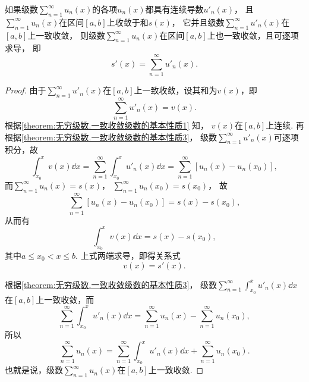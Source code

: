 \begin{property}\label{theorem:无穷级数.一致收敛级数的基本性质4}
如果级数\(\sum\limits_{n=1}^\infty u_n(x)\)的各项\(u_n(x)\)都具有连续导数\(u'_n(x)\)，
且\(\sum\limits_{n=1}^\infty u_n(x)\)在区间\([a,b]\)上收敛于和\(s(x)\)，
它并且级数\(\sum\limits_{n=1}^\infty u'_n(x)\)在\([a,b]\)上一致收敛，
则级数\(\sum\limits_{n=1}^\infty u_n(x)\)在区间\([a,b]\)上也一致收敛，且可逐项求导，
即\[
	s'(x) = \sum\limits_{n=1}^\infty u'_n(x).
\]
\begin{proof}
由于\(\sum\limits_{n=1}^\infty u'_n(x)\)在\([a,b]\)上一致收敛，设其和为\(v(x)\)，即\[
	\sum\limits_{n=1}^\infty u'_n(x) = v(x).
\]
根据\cref{theorem:无穷级数.一致收敛级数的基本性质1} 知，
\(v(x)\)在\([a,b]\)上连续.
再根据\cref{theorem:无穷级数.一致收敛级数的基本性质3}，
级数\(\sum\limits_{n=1}^\infty u'_n(x)\)可逐项积分，故\[
	\int_{x_0}^x v(x) \dd{x}
	= \sum\limits_{n=1}^\infty \int_{x_0}^x u'_n(x) \dd{x}
	= \sum\limits_{n=1}^\infty [u_n(x) - u_n(x_0)],
\]
而\(\sum\limits_{n=1}^\infty u_n(x) = s(x)\)，
\(\sum\limits_{n=1}^\infty u_n(x_0) = s(x_0)\)，
故\[
	\sum\limits_{n=1}^\infty [u_n(x) - u_n(x_0)]
	= s(x) - s(x_0),
\]
从而有\[
	\int_{x_0}^x v(x) \dd{x} = s(x) - s(x_0),
\]
其中\(a \leq x_0 < x \leq b\).
上式两端求导，即得关系式\[
	v(x) = s'(x).
\]

根据\cref{theorem:无穷级数.一致收敛级数的基本性质3}，
级数\(\sum\limits_{n=1}^\infty \int_{x_0}^x u'_n(x) \dd{x}\)在\([a,b]\)上一致收敛，而\[
	\sum\limits_{n=1}^\infty \int_{x_0}^x u'_n(x) \dd{x}
	= \sum\limits_{n=1}^\infty u_n(x)
		- \sum\limits_{n=1}^\infty u_n(x_0),
\]所以\[
	\sum\limits_{n=1}^\infty u_n(x)
	= \sum\limits_{n=1}^\infty \int_{x_0}^x u'_n(x) \dd{x}
	+ \sum\limits_{n=1}^\infty u_n(x_0).
\]也就是说，级数\(\sum\limits_{n=1}^\infty u_n(x)\)在\([a,b]\)上一致收敛.
\end{proof}
\end{property}
